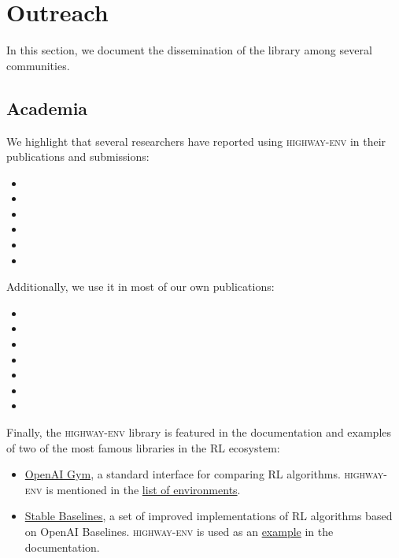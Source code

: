 \section{Outreach}
\label{sec:outreach}
In this section, we document the dissemination of the library among several communities.

\subsection{Academia}

We highlight that several researchers have reported using \textsc{highway-env} in their publications and submissions:
\begin{itemize}
	\item {}
	\item {}
	\item {}
	\item {}
	\item {}
	\item {}
\end{itemize}

\leavevmode\newline
Additionally, we use it in most of our own publications:
\begin{itemize}
	\item {}
	\item {}
	\item {}
	\item {}
	\item {}
	\item {}
	\item {}
\end{itemize}

\leavevmode\newline
\noindent Finally, the \textsc{highway-env} library is featured in the documentation and examples of two of the most famous libraries in the \gls{RL} ecosystem:
\begin{itemize}
\item \href{https://github.com/openai/gym}{OpenAI Gym}, a standard interface for comparing \gls{RL} algorithms. \textsc{highway-env} is mentioned in the \href{https://github.com/openai/gym/blob/master/docs/environments.md#highway-env-tactical-decision-making-for-autonomous-driving}{list of environments}.
\item \href{https://github.com/hill-a/stable-baselines}{Stable Baselines}, a set of improved implementations of \gls{RL} algorithms based on OpenAI Baselines. \textsc{highway-env} is used as an  \href{https://stable-baselines.readthedocs.io/en/master/guide/examples.html#hindsight-experience-replay-her}{example} in the documentation.
\end{itemize}

